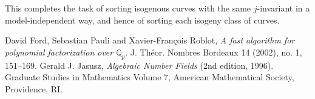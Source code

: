 \documentclass{article}
\begin{document}
This completes the task of sorting isogenous curves with the same
$j$-invariant in a model-independent way, and hence of sorting each
isogeny class of curves.


\begin{thebibliography}{10}
 David Ford, Sebastian Pauli and Xavier-Fran\c cois Roblot, {\em
  A fast algorithm for polynomial factorization over $\mathbb{Q}_p$}. J.
  Th\'eor. Nombres Bordeaux 14 (2002), no. 1, 151--169.
 Gerald J. Jasusz, {\em Algebraic Number Fields} (2nd
  edition, 1996).  Graduate Studies in Mathematics Volume 7, American
  Mathematical Society, Providence, RI.
\end{thebibliography}
\end{document}
